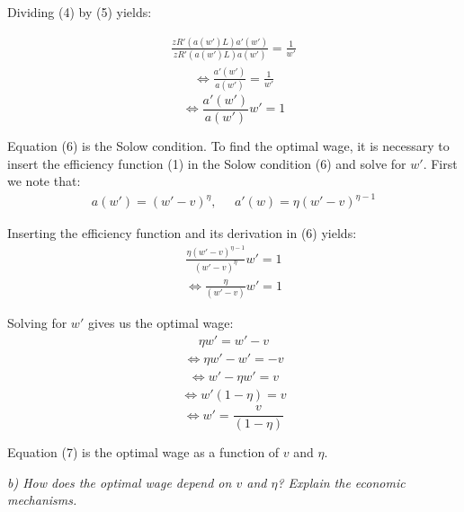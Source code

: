 \documentclass[11pt]{article} %
\begin{document}
\pagebreak
Dividing (4) by (5) yields:

\bigskip
\begin{align*}
    \frac{zR'\left(a(w')L\right)a'(w')}{zR'\left(a(w')L\right)a(w')} = \frac{1}{w'}
\end{align*}
\begin{align*}
    \Longleftrightarrow \frac{a'(w')}{a(w')} = \frac{1}{w'}
\end{align*}
\begin{equation}
    \Longleftrightarrow \frac{a'(w')}{a(w')}w' = 1
\end{equation}

\bigskip
Equation (6) is the Solow condition. To find the optimal wage, it is necessary to insert the efficiency function (1) in the Solow condition (6) and solve for $w'$. First we note that:
\begin{align*}
    a(w') = (w'-v)^{\eta}, \;\;\;\;\; a'(w) = \eta (w'-v)^{\eta-1}
\end{align*}

Inserting the efficiency function and its derivation in (6) yields:
\begin{align*}
    \frac {\eta (w'-v)^{\eta-1}} {(w'-v)^{\eta}} w' = 1
\end{align*}
\begin{align*}
    \Longleftrightarrow \frac {\eta} {(w'-v)} w' = 1
\end{align*}

Solving for $w'$ gives us the optimal wage:
\begin{align*}
    \eta w' = w'-v
\end{align*}
\begin{align*}
    \Longleftrightarrow \eta w' - w' = -v
\end{align*}
\begin{align*}
    \Longleftrightarrow w' - \eta w' = v
\end{align*}
\begin{align*}
    \Longleftrightarrow w'(1 - \eta) = v
\end{align*}
\begin{equation}
    \Longleftrightarrow w' = \frac{v} {(1 - \eta)}
\end{equation}

\bigskip
Equation (7) is the optimal wage as a function of $v$ and $\eta$.




\pagebreak
\textit{b) How does the optimal wage depend on $v$ and $\eta$? Explain the economic
mechanisms.}\par
\end{document}

